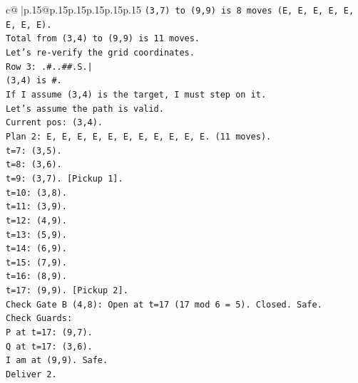\documentclass{article}
\begin{document}
{\begin{supertabular}{c@{$\;$}|p{.15\linewidth}@{}p{.15\linewidth}p{.15\linewidth}p{.15\linewidth}p{.15\linewidth}p{.15\linewidth}}
{{{\texttt{(3,7) to (9,9) is 8 moves (E, E, E, E, E, E, E, E).} \\
\texttt{Total from (3,4) to (9,9) is 11 moves.} \\
\texttt{Let's re{-}verify the grid coordinates.} \\
\texttt{Row 3: .\#..\#\#.S.|} \\
\texttt{(3,4) is \#.} \\
\texttt{If I assume (3,4) is the target, I must step on it.} \\
\texttt{Let's assume the path is valid.} \\
\texttt{Current pos: (3,4).} \\
\texttt{Plan 2: E, E, E, E, E, E, E, E, E, E, E. (11 moves).} \\
\texttt{t=7: (3,5).} \\
\texttt{t=8: (3,6).} \\
\texttt{t=9: (3,7). {[}Pickup 1{]}.} \\
\texttt{t=10: (3,8).} \\
\texttt{t=11: (3,9).} \\
\texttt{t=12: (4,9).} \\
\texttt{t=13: (5,9).} \\
\texttt{t=14: (6,9).} \\
\texttt{t=15: (7,9).} \\
\texttt{t=16: (8,9).} \\
\texttt{t=17: (9,9). {[}Pickup 2{]}.} \\
\texttt{Check Gate B (4,8): Open at t=17 (17 mod 6 = 5). Closed. Safe.} \\
\texttt{Check Guards:} \\
\texttt{P at t=17: (9,7).} \\
\texttt{Q at t=17: (3,6).} \\
\texttt{I am at (9,9). Safe.} \\
\texttt{Deliver 2.} \\
}}}
\end{supertabular}}
\end{document}
